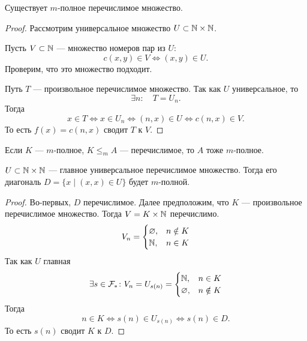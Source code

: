 \begin{thm}
    Существует $ m$-полное перечислимое множество.
\end{thm}
\begin{proof}
   Рассмотрим универсальное множество $ U \subset \mathbb{N} \times \mathbb{N}$.

	Пусть $ V \subset \mathbb{N}$ --- множество номеров пар из  $ U$:
	 \[
		 c(x, y) \in V  \Longleftrightarrow (x, y) \in U
	.\] 
	Проверим, что это множество подходит.

	Путь $ T$ --- произвольное перечислимое множество. Так как $ U$ универсальное, то
	\[
	\exists n \colon \quad T = U_n
	.\] 
	Тогда
	\[
		x \in T \Longleftrightarrow x \in U_n \Longleftrightarrow (n, x) \in U \Longleftrightarrow  c(n, x) \in V
	.\] 
	То есть $ f(x) = c(n, x)$ сводит $ T $ к $ V$.
\end{proof}


\begin{note}
    Если $ K$ --- $ m$-полное,  $ K \le _{m} A$ --- перечислимое, то $ A$ тоже $ m$-полное. 
\end{note}


\begin{thm}
	$ U \subset \mathbb{N} \times \mathbb{N}$ --- главное универсальное перечислимое множество. Тогда его диагональ $ D = \{x \mid (x, x) \in  U\}$ будет $ m$-полной.
\end{thm}
\begin{proof}
    Во-первых, $ D$ перечислимое. Далее предположим, что $ K$ --- произвольное перечислимое множество. Тогда $ V = K \times \mathbb{N}$  перечислимо.
	\[
	V_n = \begin{cases}
		\varnothing, & n \notin K \\
		\mathbb{N} , & n \in K
	\end{cases}
	\] 
	Так как $ U$ главная 
	$$ \exists s \in \mathcal{F}_{*}\colon V_n=U_{s(n)} = \begin{cases}
		\mathbb{N}, &n \in K \\
		\varnothing, & n \notin K
	\end{cases}
	$$
	Тогда 
	\[
		n \in K \Longleftrightarrow s(n) \in U_{s(n)} \Longleftrightarrow s(n) \in D
	.\] 
	То есть $ s(n)$ сводит  $ K $ к $ D$.
\end{proof}

